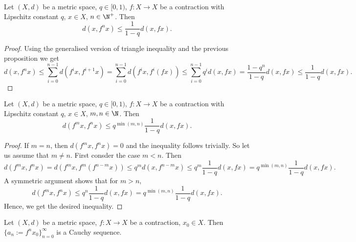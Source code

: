 \begin{proposition}
  Let
    $(X, d)$ be a metric space,
    $q \in [0, 1)$,
    $f \colon X \to X$ be a contraction with Lipschitz constant $q$,
    $x \in X$,
    $n \in \N^{+}$.
  Then
  \begin{equation}
    d(x, f^n x) \leq \frac{1}{1 - q} d(x, f x).
  \end{equation}
\end{proposition}
\begin{proof}
  Using
    the generalised version of triangle inequality and
    the previous proposition
  we get
  \begin{equation}
    d(x, f^n x)
    \leq \sum_{i = 0}^{n - 1} d(f^i x, f^{i + 1} x)
    = \sum_{i = 0}^{n - 1} d(f^i x, f^i(f x))
    \leq \sum_{i = 0}^{n - 1} q^i d(x, f x)
    = \frac{1 - q^n}{1 - q} d(x, f x)
    \leq \frac{1}{1 - q} d(x, f x).
  \end{equation}
\end{proof}
\begin{corollary}
  Let
    $(X, d)$ be a metric space,
    $q \in [0, 1)$,
    $f \colon X \to X$ be a contraction with Lipschitz constant $q$,
    $x \in X$,
    $m, n \in \N$.
  Then
  \begin{equation}
    d(f^m x, f^n x) \leq q^{\min(m, n)} \frac{1}{1 - q} d(x, f x).
  \end{equation}
\end{corollary}
\begin{proof}
  If $m = n$, then $d(f^m x, f^n x) = 0$ and the inequality follows trivially.
  So let us assume that $m \neq n$.
  First consder the case $m < n$.
  Then
  \begin{equation}
    d(f^m x, f^n x)
    = d(f^m x, f^m(f^{n - m} x))
    \leq q^m d(x, f^{n - m} x)
    \leq q^m \frac{1}{1 - q} d(x, f x)
    = q^{\min(m, n)} \frac{1}{1 - q} d(x, f x).
  \end{equation}
  A symmetric argument shows that for $m > n$,
  \begin{equation}
    d(f^m x, f^n x)
    \leq q^n \frac{1}{1 - q} d(x, f x)
    = q^{\min(m, n)} \frac{1}{1 - q} d(x, f x).
  \end{equation}
  Hence, we get the desired inequality.
\end{proof}
\begin{proposition}
  Let
    $(X, d)$ be a metric space,
    $f \colon X \to X$ be a contraction,
    $x_0 \in X$.
  Then $\{a_n := f^n x_0\}_{n = 0}^\infty$ is a Cauchy sequence.
\end{proposition}
